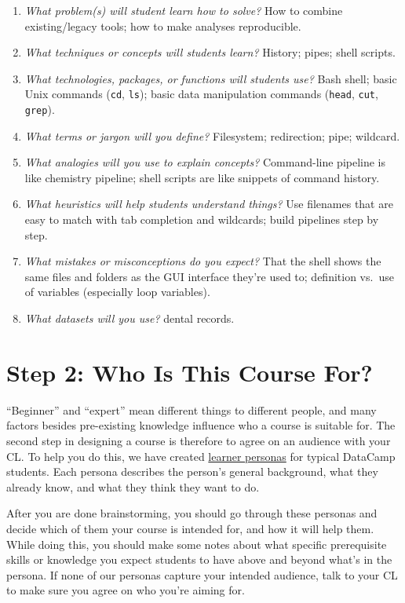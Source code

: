 \documentclass[10pt,statementpaper]{memoir}
\providecommand{\tightlist}{%
  \setlength{\itemsep}{0pt}\setlength{\parskip}{0pt}}
\begin{document}
\begin{enumerate}
\def\labelenumi{\arabic{enumi}.}
\tightlist
\item
  \emph{What problem(s) will student learn how to solve?} How to combine
  existing/legacy tools; how to make analyses reproducible.
\item
  \emph{What techniques or concepts will students learn?} History;
  pipes; shell scripts.
\item
  \emph{What technologies, packages, or functions will students use?}
  Bash shell; basic Unix commands (\texttt{cd}, \texttt{ls}); basic data
  manipulation commands (\texttt{head}, \texttt{cut}, \texttt{grep}).
\item
  \emph{What terms or jargon will you define?} Filesystem; redirection;
  pipe; wildcard.
\item
  \emph{What analogies will you use to explain concepts?} Command-line
  pipeline is like chemistry pipeline; shell scripts are like snippets
  of command history.
\item
  \emph{What heuristics will help students understand things?} Use
  filenames that are easy to match with tab completion and wildcards;
  build pipelines step by step.
\item
  \emph{What mistakes or misconceptions do you expect?} That the shell
  shows the same files and folders as the GUI interface they're used to;
  definition vs.~use of variables (especially loop variables).
\item
  \emph{What datasets will you use?} dental records.
\end{enumerate}

\section{Step 2: Who Is This Course
For?}\label{step-2-who-is-this-course-for}

``Beginner'' and ``expert'' mean different things to different people,
and many factors besides pre-existing knowledge influence who a course
is suitable for. The second step in designing a course is therefore to
agree on an audience with your CL. To help you do this, we have created
\href{personas.md}{learner personas} for typical DataCamp students. Each
persona describes the person's general background, what they already
know, and what they think they want to do.

After you are done brainstorming, you should go through these personas
and decide which of them your course is intended for, and how it will
help them. While doing this, you should make some notes about what
specific prerequisite skills or knowledge you expect students to have
above and beyond what's in the persona. If none of our personas capture
your intended audience, talk to your CL to make sure you agree on who
you're aiming for.
\end{document}
